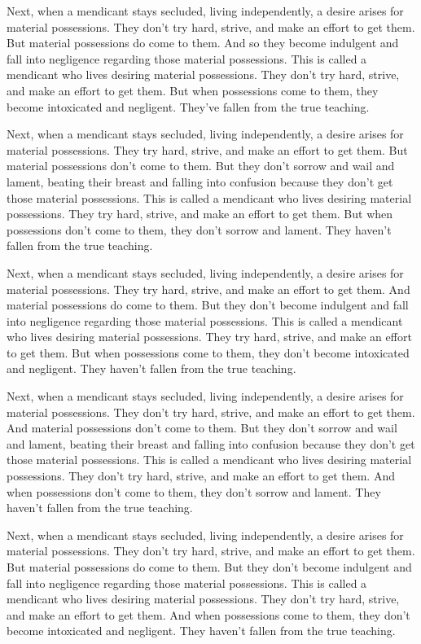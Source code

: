 \documentclass[12pt,openany]{book}%
\begin{document}
Next, when a mendicant stays secluded, living independently, a desire arises for material possessions. They don’t try hard, strive, and make an effort to get them. But material possessions do come to them. And so they become indulgent and fall into negligence regarding those material possessions. This is called a mendicant who lives desiring material possessions. They don’t try hard, strive, and make an effort to get them. But when possessions come to them, they become intoxicated and negligent. They’ve fallen from the true teaching. 

Next, when a mendicant stays secluded, living independently, a desire arises for material possessions. They try hard, strive, and make an effort to get them. But material possessions don’t come to them. But they don’t sorrow and wail and lament, beating their breast and falling into confusion because they don’t get those material possessions. This is called a mendicant who lives desiring material possessions. They try hard, strive, and make an effort to get them. But when possessions don’t come to them, they don’t sorrow and lament. They haven’t fallen from the true teaching. 

Next, when a mendicant stays secluded, living independently, a desire arises for material possessions. They try hard, strive, and make an effort to get them. And material possessions do come to them. But they don’t become indulgent and fall into negligence regarding those material possessions. This is called a mendicant who lives desiring material possessions. They try hard, strive, and make an effort to get them. But when possessions come to them, they don’t become intoxicated and negligent. They haven’t fallen from the true teaching. 

Next, when a mendicant stays secluded, living independently, a desire arises for material possessions. They don’t try hard, strive, and make an effort to get them. And material possessions don’t come to them. But they don’t sorrow and wail and lament, beating their breast and falling into confusion because they don’t get those material possessions. This is called a mendicant who lives desiring material possessions. They don’t try hard, strive, and make an effort to get them. And when possessions don’t come to them, they don’t sorrow and lament. They haven’t fallen from the true teaching. 

Next, when a mendicant stays secluded, living independently, a desire arises for material possessions. They don’t try hard, strive, and make an effort to get them. But material possessions do come to them. But they don’t become indulgent and fall into negligence regarding those material possessions. This is called a mendicant who lives desiring material possessions. They don’t try hard, strive, and make an effort to get them. And when possessions come to them, they don’t become intoxicated and negligent. They haven’t fallen from the true teaching. 
\end{document}
